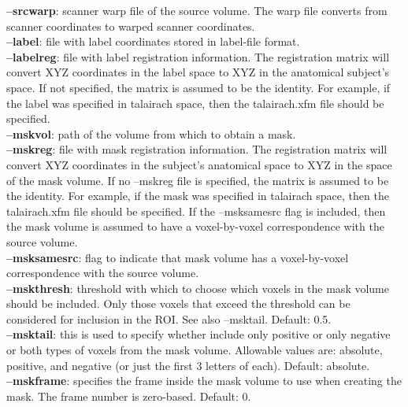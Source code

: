 \documentclass[10pt]{article}
\begin{document}
\noindent
{\bf --srcwarp}: scanner warp file of the source volume.  The warp
file converts from scanner coordinates to warped scanner coordinates.\\

\noindent
{\bf --label}: file with label coordinates stored in label-file format.\\

\noindent
{\bf --labelreg}: file with label registration information.  The
registration matrix will convert XYZ coordinates in the label space to
XYZ in the anatomical subject's space.  If not specified, the matrix
is assumed to be the identity. For example, if the label was
specified in talairach space, then the talairach.xfm file should be
specified. \\

\noindent
{\bf --mskvol}: path of the volume from which to obtain a mask.\\

\noindent
{\bf --mskreg}: file with mask registration information.  The
registration matrix will convert XYZ coordinates in the subject's
anatomical space to XYZ in the space of the mask volume.  If no
--mskreg file is specified, the matrix is assumed to be the
identity. For example, if the mask was specified in talairach space,
then the talairach.xfm file should be specified. If the --msksamesrc
flag is included, then the mask volume is assumed to have a
voxel-by-voxel correspondence with the source volume.\\

\noindent
{\bf --msksamesrc}: flag to indicate that mask volume has a
voxel-by-voxel correspondence with the source volume.\\

\noindent
{\bf --mskthresh}: threshold with which to choose which voxels in the
mask volume should be included. Only those voxels that exceed the
threshold can be considered for inclusion in the ROI. See also
--msktail.  Default: 0.5.\\

\noindent
{\bf --msktail}: this is used to specify whether include only positive or only
negative or both types of voxels from the mask volume.  Allowable
values are: absolute, positive, and negative (or just the first 3
letters of each). Default: absolute.\\

\noindent
{\bf --mskframe}: specifies the frame inside the mask volume to use
when creating the mask.  The frame number is zero-based. Default: 0.\\
\end{document}
